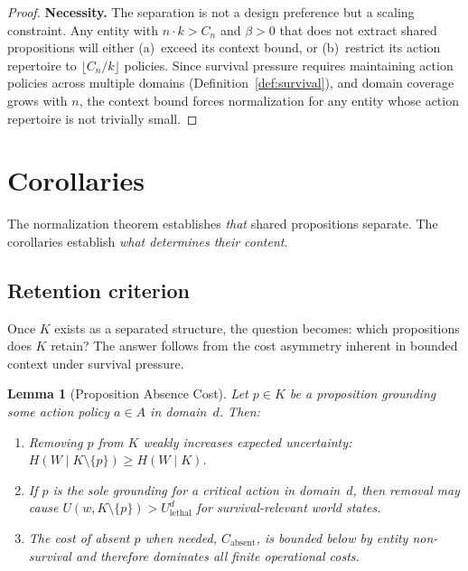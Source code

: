 \documentclass[11pt]{article}
\newtheorem{lemma}[theorem]{Lemma}
\theoremstyle{definition}
\theoremstyle{remark}
\begin{document}
\begin{proof}
\textbf{Necessity.}
The separation is not a design preference but a scaling constraint. Any
entity with $n \cdot k > C_n$ and $\beta > 0$ that does not extract
shared propositions will either (a)~exceed its context bound, or
(b)~restrict its action repertoire to $\lfloor C_n / k \rfloor$
policies. Since survival pressure requires maintaining action policies
across multiple domains (Definition~\ref{def:survival}), and domain
coverage grows with $n$, the context bound forces normalization for any
entity whose action repertoire is not trivially small.
\end{proof}

\section{Corollaries}
\label{sec:corollaries}

The normalization theorem establishes \emph{that} shared propositions
separate. The corollaries establish \emph{what determines their
content}.

\subsection{Retention criterion}

Once $K$ exists as a separated structure, the question becomes: which
propositions does $K$ retain? The answer follows from the cost
asymmetry inherent in bounded context under survival pressure.

\begin{lemma}[Proposition Absence Cost]
\label{lem:absence}
Let $p \in K$ be a proposition grounding some action policy $a \in A$ in
domain~$d$. Then:
\begin{enumerate}
\item[(i)] Removing $p$ from $K$ weakly increases expected uncertainty:
$H(W \mid K \setminus \{p\}) \geq H(W \mid K)$.
\item[(ii)] If $p$ is the sole grounding for a critical action in
domain~$d$, then removal may cause $U(w, K \setminus \{p\}) >
U_{\text{lethal}}^d$ for survival-relevant world states.
\item[(iii)] The cost of absent $p$ when needed,
$C_{\text{absent}}$, is bounded below by entity non-survival and
therefore dominates all finite operational costs.
\end{enumerate}
\end{lemma}
\end{document}
